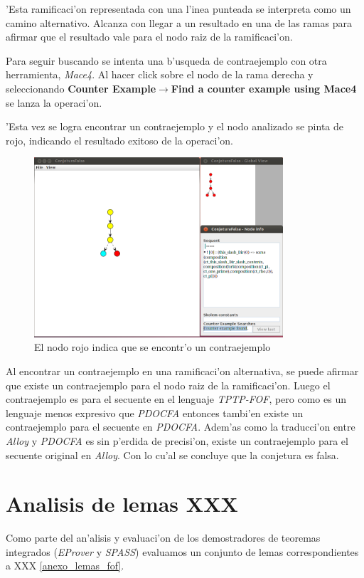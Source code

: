 'Esta ramificaci'on representada con una l'inea punteada se interpreta como un camino alternativo. Alcanza con llegar a un resultado en una de las ramas para afirmar que el resultado vale para el nodo raiz de la ramificaci'on.

Para seguir buscando se intenta una b'usqueda de contraejemplo con otra herramienta, \textit{Mace4}. Al hacer click sobre el nodo de la rama derecha y seleccionando \textbf{Counter Example$\rightarrow$Find a counter example using Mace4} se lanza la operaci'on.

'Esta vez se logra encontrar un contraejemplo y el nodo analizado se pinta de rojo, indicando el resultado exitoso de la operaci'on.

\begin{figure}[H]
	\includegraphics[width=350px]{img/conjetura_falsa_4.png}
	\centering
	\caption{El nodo rojo indica que se encontr'o un contraejemplo}
\end{figure}

Al encontrar un contraejemplo en una ramificaci'on alternativa, se puede afirmar que existe un contraejemplo para el nodo raiz de la ramificaci'on. Luego el contraejemplo es para el secuente en el lenguaje \textit{TPTP-FOF}, pero como es un lenguaje menos expresivo que \textit{PDOCFA} entonces tambi'en existe un contraejemplo para el secuente en \textit{PDOCFA}. Adem'as como la traducci'on entre \textit{Alloy} y \textit{PDOCFA} es sin p'erdida de precisi'on, existe un contraejemplo para el secuente original en \textit{Alloy}. Con lo cu'al se concluye que la conjetura es falsa.


\section{Analisis de lemas XXX}
\label{analisis_lemas}
Como parte del an'alisis y evaluaci'on de los demostradores de teoremas integrados (\textit{EProver} y \textit{SPASS}) evaluamos un conjunto de lemas correspondientes a XXX \ref{anexo_lemas_fof}.

